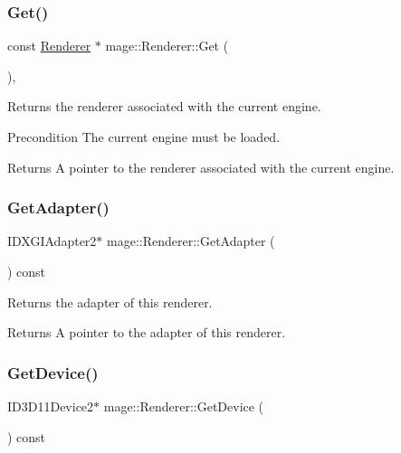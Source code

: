 \subsubsection{\texorpdfstring{Get()}{Get()}}
{\footnotesize\ttfamily const \hyperlink{classmage_1_1_renderer}{Renderer} $\ast$ mage\+::\+Renderer\+::\+Get (\begin{DoxyParamCaption}{ }\end{DoxyParamCaption})\hspace{0.3cm}{\ttfamily [static]}, {\ttfamily [noexcept]}}

Returns the renderer associated with the current engine.

\begin{DoxyPrecond}{Precondition}
The current engine must be loaded. 
\end{DoxyPrecond}
\begin{DoxyReturn}{Returns}
A pointer to the renderer associated with the current engine. 
\end{DoxyReturn}
\hypertarget{classmage_1_1_renderer_a75fe0cdffda2e282dba1081dfddaa94d}{}\label{classmage_1_1_renderer_a75fe0cdffda2e282dba1081dfddaa94d} 
\subsubsection{\texorpdfstring{Get\+Adapter()}{GetAdapter()}}
{\footnotesize\ttfamily I\+D\+X\+G\+I\+Adapter2$\ast$ mage\+::\+Renderer\+::\+Get\+Adapter (\begin{DoxyParamCaption}{ }\end{DoxyParamCaption}) const\hspace{0.3cm}{\ttfamily [noexcept]}}

Returns the adapter of this renderer.

\begin{DoxyReturn}{Returns}
A pointer to the adapter of this renderer. 
\end{DoxyReturn}
\hypertarget{classmage_1_1_renderer_a9510b8784447ed0fa9b43e7a4bf1fc80}{}\label{classmage_1_1_renderer_a9510b8784447ed0fa9b43e7a4bf1fc80} 
\subsubsection{\texorpdfstring{Get\+Device()}{GetDevice()}}
{\footnotesize\ttfamily I\+D3\+D11\+Device2$\ast$ mage\+::\+Renderer\+::\+Get\+Device (\begin{DoxyParamCaption}{ }\end{DoxyParamCaption}) const\hspace{0.3cm}{\ttfamily [noexcept]}}

